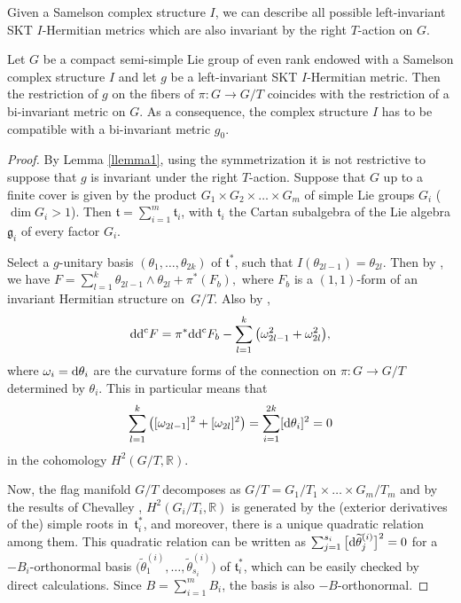 Given a Samelson complex structure $I$, we can describe all possible left-invariant SKT $I$-Hermitian metrics which are also invariant by the right $T$-action on $G$.

\begin{Theorem}\label{lemma2}
Let $G$ be a compact semi-simple Lie group of even rank endowed with a Samelson complex structure $I$ and let $g$ be a left-invariant SKT $I$-Hermitian metric.
Then the restriction of $g$ on the fibers of $\pi\colon G \rightarrow G/T$ coincides with the restriction of a bi-invariant metric on $G$. As a consequence, the complex structure $I$ has to be compatible with a bi-invariant metric $g_0$.
\end{Theorem}

\begin{proof} By Lemma \ref{llemma1}, using the symmetrization it is not restrictive to suppose that $g$ is invariant under the right $T$-action.
 Suppose that $G$ up to a finite cover is given by the product $G_1\times G_2\times \dots \times G_m$ of simple Lie groups $G_i$ ($ \dim G_i > 1$). Then $\mathfrak t = \sum_{i = 1}^m \mathfrak t_i$, with $\mathfrak t_i$ the Cartan subalgebra of the Lie algebra $\mathfrak g_i$ of every factor $G_i$.


Select a $g$-unitary basis $(\theta_1, \dots , \theta_{2k})$ of $\mathfrak t^*$, such that $ I(\theta_{2l-1})=\theta_{2l}$.
Then by \cite{GGP}, we have $F = \sum_{l = 1}^k \theta_{2l-1}\wedge\theta_{2l} + \pi^*(F_b),$ where $F_b$ is a $(1,1)$-form of an invariant Hermitian structure on~$G/T$. Also by \cite[Section~5]{GGP},
\[
{\rm d}{\rm d}^{\rm c} F = \pi^*{\rm d}{\rm d}^{\rm c} F_b - \sum_{l = 1}^k \big(\omega_{2l-1}^2+\omega_{2l}^2\big),
\]
 where $\omega_i = {\rm d}\theta_i$ are the curvature forms of the connection on $\pi\colon G\rightarrow G/T$ determined by $\theta_i$. This in particular means that
 \[
 \sum_{l=1}^k \big([\omega_{2l-1}]^2+[\omega_{2l}]^2\big) = \sum_{i=1}^{2k} [{\rm d}\theta_i]^2 = 0
 \]
 in the cohomology $H^2(G/T, \mathbb{R})$.

Now, the flag manifold $G/T$ decomposes as $G/T = G_1/T_1\times\dots \times G_m/T_m$ and by the results of Chevalley \cite{Chevalley}, $H^2(G_i/T_i, \mathbb{R})$ is generated by the (exterior derivatives of the) simple roots in~$\mathfrak t_i^*$, and moreover, there is a unique quadratic relation among them. This quadratic relation can be written as $\sum_{j=1}^{s_i} \big[{\rm d}\widetilde{\theta}^{(i)}_j\big]^2 = 0$ for
a $-B_i$-orthonormal basis $\big(\widetilde{\theta}^{(i)}_1, \dots, \widetilde{\theta}^{(i)}_{s_i}\big)$ of $\mathfrak t_i^*$, which can be easily checked by direct calculations. Since $B =\sum_{i =1}^m B_i$, the basis is also $-B$-orthonormal.


\end{proof}
